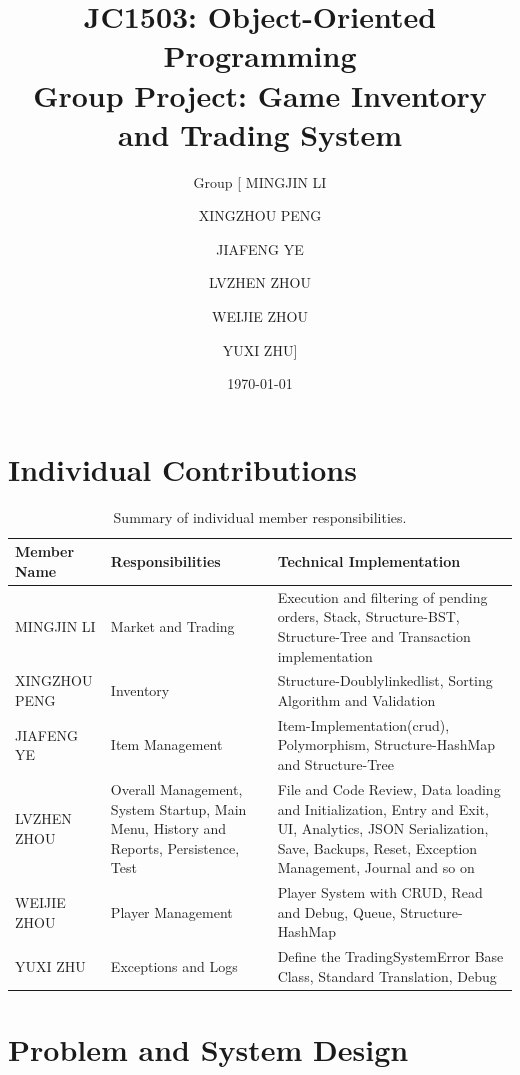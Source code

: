 \documentclass[11pt,a4paper]{article}
\title{JC1503: Object-Oriented Programming \\ \huge Group Project: Game Inventory and Trading System}
\author{Group [
MINGJIN LI \and
XINGZHOU PENG \and
JIAFENG YE \and
LVZHEN ZHOU \and
WEIJIE ZHOU \and
YUXI ZHU]}
\date{\today}
\begin{document}
\maketitle

\section*{Individual Contributions}
\begin{table}[h]
    \centering
    \begin{tabular}{l >{\raggedright\arraybackslash}p{5cm} >{\raggedright\arraybackslash}p{6cm}}
        \toprule
        \textbf{Member Name} & \textbf{Responsibilities} & \textbf{Technical Implementation} \\
        \midrule
        MINGJIN LI & Market and Trading & Execution and filtering of pending orders, Stack, Structure-BST, Structure-Tree and Transaction implementation \\
        \midrule
        XINGZHOU PENG & Inventory & Structure-Doublylinkedlist, Sorting Algorithm and Validation \\
        \midrule
        JIAFENG YE & Item Management & Item-Implementation(crud), Polymorphism, Structure-HashMap and Structure-Tree \\
        \midrule
        LVZHEN ZHOU & Overall Management, System Startup, Main Menu, History and Reports, Persistence, Test & File and Code Review, Data loading and Initialization, Entry and Exit, UI, Analytics, JSON Serialization, Save, Backups, Reset, Exception Management, Journal and so on  \\
        \midrule
        WEIJIE ZHOU & Player Management & Player System with CRUD, Read and Debug, Queue,  Structure-HashMap \\
        \midrule
        YUXI ZHU & Exceptions and Logs & Define the TradingSystemError Base Class, Standard Translation, Debug \\
        \bottomrule
    \end{tabular}
    \caption{Summary of individual member responsibilities.}
\end{table}

\vfill

\newpage

\section{Problem and System Design}
\label{sec:problem_design}
\end{document}
